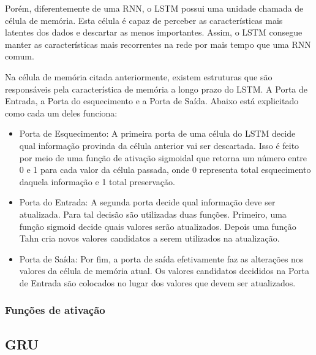 
Porém, diferentemente de uma \acrshort{RNN}, o LSTM possui uma unidade chamada de célula de memória. Esta célula é capaz de perceber as características mais latentes dos dados e descartar as menos importantes. Assim, o \acrshort{LSTM} consegue manter as características mais recorrentes na rede por mais tempo que uma \acrshort{RNN} comum. 

Na célula de memória citada anteriormente, existem estruturas que são responsáveis pela característica de memória a longo prazo do \acrshort{LSTM}. A Porta de Entrada, a Porta do esquecimento e a Porta de Saída. Abaixo está explicitado como cada um deles funciona:
\begin{itemize}
  \item Porta de Esquecimento: A primeira porta de uma célula do \acrfull{LSTM} decide qual informação provinda da célula anterior vai ser descartada. Isso é feito por meio de uma função de ativação sigmoidal que retorna um número entre 0 e 1 para cada valor da célula passada, onde 0 representa total esquecimento daquela informação e 1 total preservação.
  
  \item Porta do Entrada: A segunda porta decide qual informação deve ser atualizada. Para tal decisão são utilizadas duas funções. Primeiro, uma função sigmoid decide quais valores serão atualizados. Depois uma função Tahn cria novos valores candidatos a serem utilizados na atualização.
  \item Porta de Saída: Por fim, a porta de saída efetivamente faz as alterações nos valores da célula de memória atual. Os valores candidatos decididos na Porta de Entrada são colocados no lugar dos valores que devem ser atualizados.
\end{itemize}


\subsubsection{Funções de ativação}

\subsection{\acrfull{GRU}}


